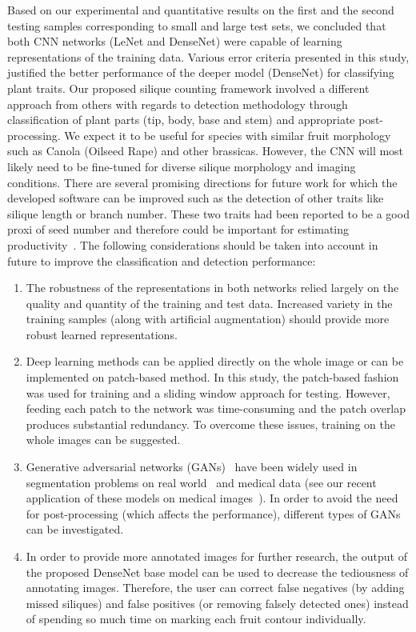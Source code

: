 \documentclass[a4paper,num-refs]{oup-contemporary}
\begin{document}
Based on our experimental and quantitative results on the first and the second testing samples corresponding to small and large test sets, we concluded that both CNN networks (LeNet and DenseNet) were capable of learning representations of the training data. Various error criteria presented in this study, justified the better performance of the deeper model (DenseNet) for classifying plant traits. Our proposed silique counting framework involved a different approach from others with regards to detection methodology through classification of plant parts (tip, body, base and stem) and  appropriate post-processing. We expect it to be useful for species with similar fruit morphology such as Canola (Oilseed Rape) and other brassicas. However, the CNN will most likely need to be fine-tuned for diverse silique morphology and imaging conditions. 
There are several promising directions for future work for which the developed software can be improved such as the detection of other traits like silique length or branch number. These two traits had been reported to be a good proxi of seed number and therefore could be important for estimating productivity~\cite{bac2015genomeb}. The following considerations should be taken into account in future to improve the classification and detection performance: 
\begin{enumerate}
    \item The robustness of the representations in both networks  relied largely on the quality and quantity of the training and test data. Increased variety in the training samples (along with artificial augmentation) should provide more robust learned representations.
    \item Deep learning methods can be applied directly on the whole image or can be implemented  on patch-based method. In this study, the patch-based fashion was used for training and a sliding window approach for testing. However, feeding each patch to the network was time-consuming and the patch overlap produces substantial redundancy. To overcome these issues, training on the whole images can be suggested.
    \item Generative adversarial networks (GANs)~\cite{goodfellow2014generative} have been widely used in segmentation problems on real world~\cite{isola2017image,luc2016semantic} and medical data (see our recent application of these models on medical images~\cite{hamidinekoo2018deep,grall2019using}). In order to avoid the need for post-processing (which affects the performance), different types of GANs can be investigated.
    \item In order to provide more annotated images for further research, the output of the proposed DenseNet base model can be used to decrease the tediousness of annotating images. Therefore, the user can correct false negatives (by adding missed siliques) and false positives (or removing falsely detected ones) instead of spending so much time on marking each fruit contour individually. 
\end{enumerate}
\end{document}

